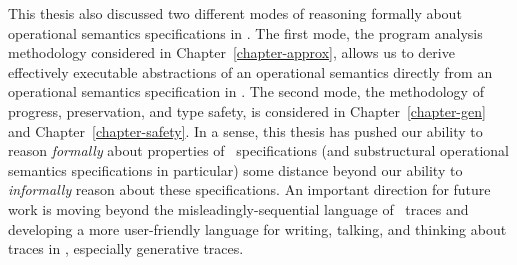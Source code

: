 
This thesis also discussed two different modes of reasoning formally
about operational semantics specifications in \sls. The first mode,
the program analysis methodology considered in
Chapter~\ref{chapter-approx}, allows us to derive effectively
executable abstractions of an operational semantics directly from an
operational semantics specification in \sls. The second mode, the
methodology of progress, preservation, and type safety, is considered
in Chapter~\ref{chapter-gen} and Chapter~\ref{chapter-safety}. In a
sense, this thesis has pushed our ability to reason {\it formally}
about properties of \sls~specifications (and substructural operational
semantics specifications in particular) some distance beyond our
ability to {\it informally} reason about these specifications. An
important direction for future work is moving beyond the
misleadingly-sequential language of \sls~traces and developing a more
user-friendly language for writing, talking, and thinking about 
traces in \sls, especially generative traces. 
